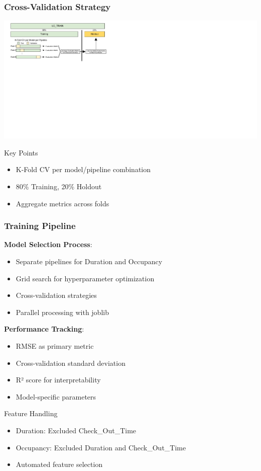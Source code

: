 \documentclass{beamer}
\begin{document}
\begin{frame}
\frametitle{Cross-Validation Strategy}
    \includegraphics[width=\textwidth]{images/modeling/model_building.pdf}
    
    \begin{alertblock}{Key Points}
        \begin{itemize}
        \item K-Fold CV per model/pipeline combination
        \item 80\% Training, 20\% Holdout
        \item Aggregate metrics across folds
        \end{itemize}
    \end{alertblock}
\end{frame}

\begin{frame}
\frametitle{Training Pipeline}
    \textbf{Model Selection Process}:
        \begin{itemize}
        \item Separate pipelines for Duration and Occupancy
        \item Grid search for hyperparameter optimization
        \item Cross-validation strategies
        \item Parallel processing with joblib
        \end{itemize}
    
    \textbf{Performance Tracking}:
        \begin{itemize}
        \item RMSE as primary metric
        \item Cross-validation standard deviation
        \item R² score for interpretability
        \item Model-specific parameters
        \end{itemize}

    \begin{block}{Feature Handling}
        \begin{itemize}
        \item Duration: Excluded Check\_Out\_Time
        \item Occupancy: Excluded Duration and Check\_Out\_Time
        \item Automated feature selection
        \end{itemize}
    \end{block}
\end{frame}
\end{document}
